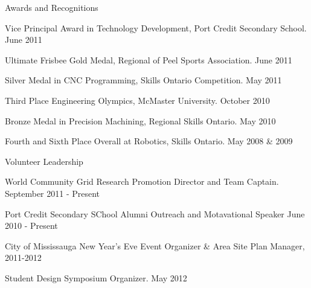 \documentclass{resume} %
\begin{document}
\begin{rSection}{Awards and Recognitions}
\item Vice Principal Award in Technology Development, Port Credit Secondary School. June 2011
\item Ultimate Frisbee Gold Medal, Regional of Peel Sports Association. June 2011
\item Silver Medal in CNC Programming, Skills Ontario Competition. May 2011
\item Third Place Engineering Olympics, McMaster University. October 2010
\item Bronze Medal in Precision Machining, Regional Skills Ontario. May 2010
\item Fourth and Sixth Place Overall at Robotics, Skills Ontario. May 2008 \& 2009
\end{rSection}


\begin{rSection}{Volunteer Leadership}
\item World Community Grid Research Promotion Director and Team Captain. September 2011 - Present
\item Port Credit Secondary SChool Alumni Outreach and Motavational Speaker June 2010 - Present
\item City of Mississauga New Year's Eve Event Organizer \& Area Site Plan Manager, 2011-2012
\item Student Design Symposium Organizer. May 2012

\end{rSection}
\end{document}
